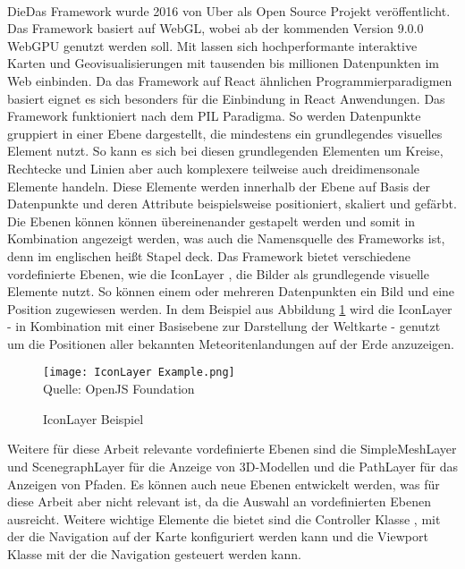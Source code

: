 \paragraph{\deckgl{}}
DieDas Framework \deckgl{} wurde 2016 von Uber als Open Source Projekt veröffentlicht\cite{Visgl}. Das Framework basiert auf \ac{WebGL}, wobei ab der kommenden Version 9.0.0 WebGPU genutzt werden soll\cite{Green2022}. Mit \deckgl lassen sich hochperformante interaktive Karten und Geovisualisierungen mit tausenden bis millionen Datenpunkten im Web einbinden. Da das Framework auf React ähnlichen Programmierparadigmen basiert eignet es sich besonders für die Einbindung in React Anwendungen. Das Framework funktioniert nach dem \ac{PIL} Paradigma. So werden Datenpunkte gruppiert in einer Ebene dargestellt, die mindestens ein grundlegendes visuelles Element nutzt. So kann es sich bei diesen grundlegenden Elementen um Kreise, Rechtecke und Linien aber auch komplexere teilweise auch dreidimensonale Elemente handeln. Diese Elemente werden innerhalb der Ebene auf Basis der Datenpunkte und deren Attribute beispielsweise positioniert, skaliert und gefärbt. Die Ebenen können können übereinenander gestapelt werden und somit in Kombination angezeigt werden, was auch die Namensquelle des Frameworks ist, denn im englischen heißt Stapel deck.\cite[S.~2]{YangWang2019} Das Framework bietet verschiedene vordefinierte Ebenen, wie die IconLayer \cite{DeckglIconLayer}, die Bilder als grundlegende visuelle Elemente nutzt. So können einem oder mehreren Datenpunkten ein Bild und eine Position zugewiesen werden. In dem Beispiel aus Abbildung \ref{fig:IconLayerExample} wird die IconLayer - in Kombination mit einer Basisebene zur Darstellung der Weltkarte - genutzt um die Positionen aller bekannten Meteoritenlandungen auf der Erde anzuzeigen.

\begin{figure}[H]
    \caption{IconLayer Beispiel}\label{fig:IconLayerExample}
    \texttt{[image: IconLayer Example.png]}
    \\
    Quelle: OpenJS Foundation \cite{DeckGlMeteorites}
\end{figure}

Weitere für diese Arbeit relevante vordefinierte Ebenen sind die SimpleMeshLayer \cite{DeckglSimpleMeshLayer} und ScenegraphLayer \cite{DeckglScenegraphLayer} für die Anzeige von 3D-Modellen und die PathLayer für das Anzeigen von Pfaden. Es können auch neue Ebenen entwickelt werden, was für diese Arbeit aber nicht relevant ist, da die Auswahl an vordefinierten Ebenen ausreicht. Weitere wichtige Elemente die \deckgl{} bietet sind die Controller Klasse \cite{DeckglController}, mit der die Navigation auf der Karte konfiguriert werden kann und die Viewport Klasse \cite{DeckglViewport} mit der die Navigation gesteuert werden kann.

